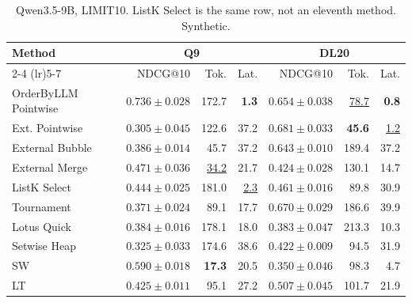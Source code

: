 \begin{table}[t]
\centering\footnotesize\setlength{\tabcolsep}{3.2pt}\renewcommand{\arraystretch}{1.12}
\caption{Qwen3.5-9B, LIMIT10. ListK Select is the same row, not an eleventh method. Synthetic.}
\begin{tabular}{@{}lrrrrrr@{}}
\toprule
Method & \multicolumn{3}{c}{Q9} & \multicolumn{3}{c}{DL20} \\
\cmidrule(lr){2-4} \cmidrule(lr){5-7}
 & NDCG@10 & Tok. & Lat. & NDCG@10 & Tok. & Lat. \\
\midrule
OrderByLLM Pointwise & \textbf{$0.736\pm0.028$} & 172.7 & \textbf{1.3} & $0.654\pm0.038$ & \underline{78.7} & \textbf{0.8} \\
Ext. Pointwise & $0.305\pm0.045$ & 122.6 & 37.2 & \textbf{$0.681\pm0.033$} & \textbf{45.6} & \underline{1.2} \\
External Bubble & $0.386\pm0.014$ & 45.7 & 37.2 & $0.643\pm0.010$ & 189.4 & 37.2 \\
External Merge & $0.471\pm0.036$ & \underline{34.2} & 21.7 & $0.424\pm0.028$ & 130.1 & 14.7 \\
ListK Select & $0.444\pm0.025$ & 181.0 & \underline{2.3} & $0.461\pm0.016$ & 89.8 & 30.9 \\
Tournament & $0.371\pm0.024$ & 89.1 & 17.7 & \underline{$0.670\pm0.029$} & 186.6 & 39.9 \\
Lotus Quick & $0.384\pm0.016$ & 178.1 & 18.0 & $0.383\pm0.047$ & 213.3 & 10.3 \\
Setwise Heap & $0.325\pm0.033$ & 174.6 & 38.6 & $0.422\pm0.009$ & 94.5 & 31.9 \\
SW & \underline{$0.590\pm0.018$} & \textbf{17.3} & 20.5 & $0.350\pm0.046$ & 98.3 & 4.7 \\
LT & $0.425\pm0.011$ & 95.1 & 27.2 & $0.507\pm0.045$ & 101.7 & 21.9 \\
\bottomrule
\end{tabular}
\end{table}


